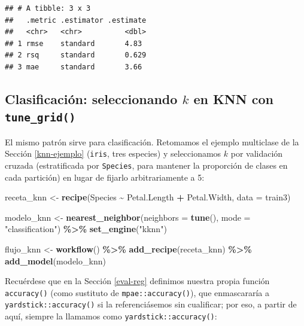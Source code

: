 \documentclass[
]{book}
\newenvironment{Shaded}{\begin{snugshade}}{\end{snugshade}}
\newcommand{\AttributeTok}[1]{\textcolor[rgb]{0.13,0.29,0.53}{#1}}
\newcommand{\FunctionTok}[1]{\textcolor[rgb]{0.13,0.29,0.53}{\textbf{#1}}}
\newcommand{\NormalTok}[1]{#1}
\newcommand{\OtherTok}[1]{\textcolor[rgb]{0.56,0.35,0.01}{#1}}
\newcommand{\SpecialCharTok}[1]{\textcolor[rgb]{0.81,0.36,0.00}{\textbf{#1}}}
\newcommand{\StringTok}[1]{\textcolor[rgb]{0.31,0.60,0.02}{#1}}
\theoremstyle{break}
\theoremstyle{nonumberplain}
\begin{document}
\begin{verbatim}
## # A tibble: 3 x 3
##   .metric .estimator .estimate
##   <chr>   <chr>          <dbl>
## 1 rmse    standard       4.83 
## 2 rsq     standard       0.629
## 3 mae     standard       3.66
\end{verbatim}

\subsection{\texorpdfstring{Clasificación: seleccionando \(k\) en KNN con \texttt{tune\_grid()}}{Clasificación: seleccionando k en KNN con tune\_grid()}}\label{tidymodels-clas}

El mismo patrón sirve para clasificación. Retomamos el ejemplo multiclase de la Sección \ref{knn-ejemplo} (\texttt{iris}, tres especies) y seleccionamos \(k\) por validación cruzada (estratificada por \texttt{Species}, para mantener la proporción de clases en cada partición) en lugar de fijarlo arbitrariamente a 5:

\begin{Shaded}
\begin{Highlighting}[]
\NormalTok{receta\_knn }\OtherTok{\textless{}{-}} \FunctionTok{recipe}\NormalTok{(Species }\SpecialCharTok{\textasciitilde{}}\NormalTok{ Petal.Length }\SpecialCharTok{+}\NormalTok{ Petal.Width, }\AttributeTok{data =}\NormalTok{ train3)}

\NormalTok{modelo\_knn }\OtherTok{\textless{}{-}} \FunctionTok{nearest\_neighbor}\NormalTok{(}\AttributeTok{neighbors =} \FunctionTok{tune}\NormalTok{(),}
                                \AttributeTok{mode =} \StringTok{"classification"}\NormalTok{) }\SpecialCharTok{\%\textgreater{}\%}
  \FunctionTok{set\_engine}\NormalTok{(}\StringTok{"kknn"}\NormalTok{)}

\NormalTok{flujo\_knn }\OtherTok{\textless{}{-}} \FunctionTok{workflow}\NormalTok{() }\SpecialCharTok{\%\textgreater{}\%}
  \FunctionTok{add\_recipe}\NormalTok{(receta\_knn) }\SpecialCharTok{\%\textgreater{}\%}
  \FunctionTok{add\_model}\NormalTok{(modelo\_knn)}
\end{Highlighting}
\end{Shaded}

Recuérdese que en la Sección \ref{eval-reg} definimos nuestra propia función \texttt{accuracy()} (como sustituto de \texttt{mpae::accuracy()}), que enmascararía a \texttt{yardstick::accuracy()} si la referenciásemos sin cualificar; por eso, a partir de aquí, siempre la llamamos como \texttt{yardstick::accuracy()}:
\end{document}
